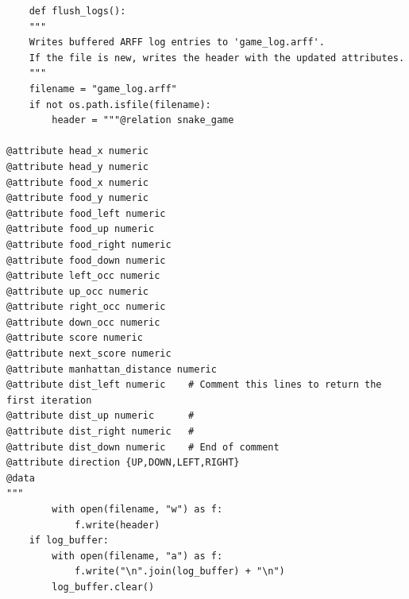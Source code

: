 \documentclass[12pt,a4paper]{article}
\begin{document}
\begin{verbatim}
    def flush_logs():
    """
    Writes buffered ARFF log entries to 'game_log.arff'.
    If the file is new, writes the header with the updated attributes.
    """
    filename = "game_log.arff"
    if not os.path.isfile(filename):
        header = """@relation snake_game

@attribute head_x numeric
@attribute head_y numeric
@attribute food_x numeric
@attribute food_y numeric
@attribute food_left numeric
@attribute food_up numeric
@attribute food_right numeric
@attribute food_down numeric
@attribute left_occ numeric
@attribute up_occ numeric
@attribute right_occ numeric
@attribute down_occ numeric
@attribute score numeric
@attribute next_score numeric
@attribute manhattan_distance numeric
@attribute dist_left numeric    # Comment this lines to return the first iteration
@attribute dist_up numeric      #
@attribute dist_right numeric   #
@attribute dist_down numeric    # End of comment
@attribute direction {UP,DOWN,LEFT,RIGHT}
@data
"""
        with open(filename, "w") as f:
            f.write(header)
    if log_buffer:
        with open(filename, "a") as f:
            f.write("\n".join(log_buffer) + "\n")
        log_buffer.clear()

\end{verbatim}
\end{document}
